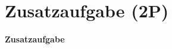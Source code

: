 \newpage

\section*{Zusatzaufgabe (2P)}



\label{LastTask}

\newpage



\begin{enumerate}





\newpage





\end{enumerate}

\textbf{Zusatzaufgabe}


	

